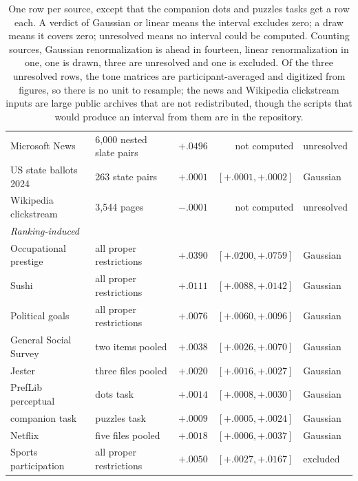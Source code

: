\documentclass[11pt]{article}
\theoremstyle{italichead}
\begin{document}
\begin{table}[htbp]
\begin{tabular}{llrrl}
Microsoft News & 6{,}000 nested slate pairs & $+.0496$ & not computed & unresolved \\
US state ballots 2024 & 263 state pairs & $+.0001$ & $[+.0001, +.0002]$ & Gaussian\footnotemark[6] \\
Wikipedia clickstream & 3{,}544 pages & $-.0001$ & not computed & unresolved \\
\midrule
\multicolumn{5}{l}{\emph{Ranking-induced}} \\
Occupational prestige & all proper restrictions & $+.0390$ & $[+.0200, +.0759]$ & Gaussian \\
Sushi & all proper restrictions & $+.0111$ & $[+.0088, +.0142]$ & Gaussian \\
Political goals & all proper restrictions & $+.0076$ & $[+.0060, +.0096]$ & Gaussian \\
General Social Survey & two items pooled\footnotemark[7] & $+.0038$ & $[+.0026, +.0070]$ & Gaussian \\
Jester & three files pooled\footnotemark[7] & $+.0020$ & $[+.0016, +.0027]$ & Gaussian \\
PrefLib perceptual & dots task & $+.0014$ & $[+.0008, +.0030]$ & Gaussian \\
\quad companion task & puzzles task & $+.0009$ & $[+.0005, +.0024]$ & Gaussian \\
Netflix & five files pooled\footnotemark[7] & $+.0018$ & $[+.0006, +.0037]$ & Gaussian \\
Sports participation & all proper restrictions & $+.0050$ & $[+.0027, +.0167]$ & excluded\footnotemark[8] \\
\bottomrule
\end{tabular}
\caption{One row per source, except that the companion dots and puzzles tasks get a row each.
A verdict of Gaussian or linear means the interval excludes zero; a draw means it covers zero;
unresolved means no interval could be computed. Counting sources, Gaussian renormalization is
ahead in fourteen, linear renormalization in one, one is drawn, three are unresolved and one is
excluded. Of the three unresolved rows, the tone matrices are participant-averaged and
digitized from figures, so there is no unit to resample; the news and Wikipedia clickstream
inputs are large public archives that are not redistributed, though the scripts that would
produce an interval from them are in the repository.}
\label{tab:bysource}
\end{table}
\end{document}
